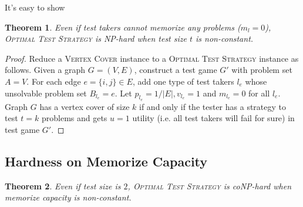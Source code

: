 \documentclass{article}
\newtheorem{theorem}{Theorem}
\begin{document}
It's easy to show

\begin{theorem}\label{thm:test-hardness}
Even if test takers cannot memorize any problems ($m_l = 0$), \textsc{Optimal
Test Strategy} is NP-hard when test size $t$ is non-constant.
\end{theorem}

\begin{proof}
	Reduce a \textsc{Vertex Cover} instance to a \textsc{Optimal Test
	Strategy} instance as follows. Given a graph $G = (V, E)$, construct a
	test game $G'$ with problem set $A = V$.  For each edge $e = \{i, j\}
	\in E$, add one type of test takers $l_e$ whose unsolvable problem set
	$B_{l_e} = e$. Let $p_{l_e} = 1/|E|, v_{l_e} = 1$ and $m_{l_e} = 0$ for
	all $l_e$.  Graph $G$ has a vertex cover of size $k$ if and only if the
	tester has a strategy to test $t = k$ problems and gets $u=1$ utility
	(i.e. all test takers will fail for sure) in test game $G'$.
\end{proof}

\subsection{Hardness on Memorize Capacity}


\begin{theorem}\label{thm:memorize-hardness}
Even if test size is $2$, \textsc{Optimal Test Strategy} is coNP-hard when
memorize capacity is non-constant.
\end{theorem}
\end{document}
